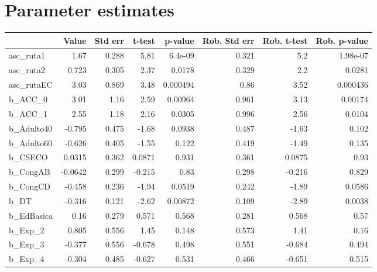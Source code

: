 \section{Parameter estimates}
\begin{tabular}{lrrrrrrr}
\toprule
{} &   Value &  Std err &   t-test &  p-value &  Rob. Std err &  Rob. t-test &  Rob. p-value \\
\midrule
asc\_ruta1     &    1.67 &    0.288 &     5.81 &  6.4e-09 &         0.321 &          5.2 &      1.98e-07 \\
asc\_ruta2     &   0.723 &    0.305 &     2.37 &   0.0178 &         0.329 &          2.2 &        0.0281 \\
asc\_rutaEC    &    3.03 &    0.869 &     3.48 & 0.000494 &          0.86 &         3.52 &      0.000436 \\
b\_ACC\_0       &    3.01 &     1.16 &     2.59 &  0.00964 &         0.961 &         3.13 &       0.00174 \\
b\_ACC\_1       &    2.55 &     1.18 &     2.16 &   0.0305 &         0.996 &         2.56 &        0.0104 \\
b\_Adulto40    &  -0.795 &    0.475 &    -1.68 &   0.0938 &         0.487 &        -1.63 &         0.102 \\
b\_Adulto60    &  -0.626 &    0.405 &    -1.55 &    0.122 &         0.419 &        -1.49 &         0.135 \\
b\_CSECO       &  0.0315 &    0.362 &   0.0871 &    0.931 &         0.361 &       0.0875 &          0.93 \\
b\_CongAB      & -0.0642 &    0.299 &   -0.215 &     0.83 &         0.298 &       -0.216 &         0.829 \\
b\_CongCD      &  -0.458 &    0.236 &    -1.94 &   0.0519 &         0.242 &        -1.89 &        0.0586 \\
b\_DT          &  -0.316 &    0.121 &    -2.62 &  0.00872 &         0.109 &        -2.89 &        0.0038 \\
b\_EdBasica    &    0.16 &    0.279 &    0.571 &    0.568 &         0.281 &        0.568 &          0.57 \\
b\_Exp\_2       &   0.805 &    0.556 &     1.45 &    0.148 &         0.573 &         1.41 &          0.16 \\
b\_Exp\_3       &  -0.377 &    0.556 &   -0.678 &    0.498 &         0.551 &       -0.684 &         0.494 \\
b\_Exp\_4       &  -0.304 &    0.485 &   -0.627 &    0.531 &         0.466 &       -0.651 &         0.515 \\

\end{tabular}
